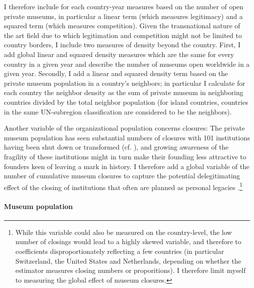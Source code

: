 \documentclass[11pt]{article}
\begin{document}
I therefore include for each country-year measures based on the number of open private museums, in particular a linear term (which measures legitimacy) and a squared term (which measures competition).
Given the transnational nature of the art field due to which legitimation and competition might not be limited to country borders, I include two measures of density beyond the country.
First, I add global linear and squared density measures which are the same for every country in a given year and describe the number of museums open worldwide in a given year.
Secondly, I add a linear and squared density term based on the private museum population in a country's neighbors; in particular I calculate for each country the neighbor density as the sum of private museum in neighboring countries divided by the total neighbor population (for island countries, countries in the same UN-subregion classification are considered to be the neighbors). 


Another variable of the organizational population concerns closures:
The private museum population has seen substantial numbers of closures with 101 institutions having been shut down or transformed (cf. \cite{Velthuis_Gera_forthcoming_fragility}), and growing awareness of the fragility of these institutions might in turn make their founding less attractive to founders keen of leaving a mark in history.
I therefore add a global variable of the number of cumulative museum closures to capture the potential delegitimating effect of the closing of institutions that often are planned as personal legacies \parencite{Walker_2019_collector}.\footnote{While this variable could also be measured on the country-level, the low number of closings would lead to a highly skewed variable, and therefore to coefficients disproportionately reflecting a few countries (in particular Switzerland, the United States and Netherlands, depending on whether the estimator measures closing numbers or proporitions). I therefore limit myself to measuring the global effect of museum closures.} 




\paragraph*{Museum population}
\end{document}
